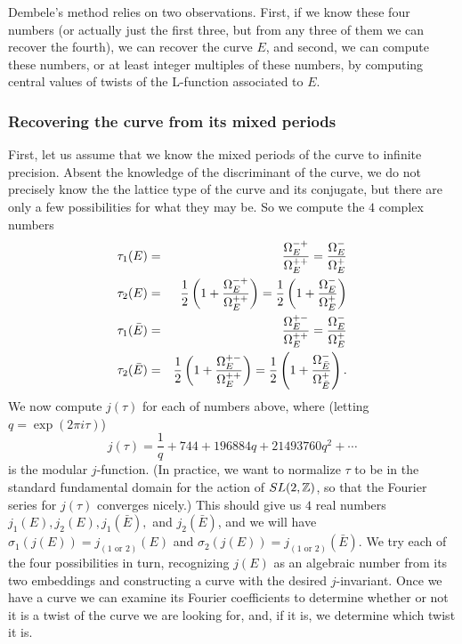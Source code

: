 Dembele's method relies on two observations. First, if we know these four numbers (or actually just the first three,
but from any three of them we can recover the fourth), we can recover the curve
$E$, and second, we can compute these numbers, or at least integer multiples of these numbers, by computing
central values of twists of the L-function associated to $E$.

\subsubsection{Recovering the curve from its mixed periods}

First, let us assume that we know the mixed periods of the curve to infinite precision. Absent the knowledge
of the discriminant of the curve, we do not precisely know the the lattice type of the curve and its conjugate,
but there are only a few possibilities for what they may be. So we compute the $4$ complex numbers
\begin{eqnarray*}
    \tau_1(E) &=& \frac{\Omega^{-+}_E}{\Omega^{++}_E} = \frac{\Omega^-_E}{\Omega^+_E} \\
    \tau_2(E) &=& \frac{1}{2}\left(1 + \frac{\Omega^{-+}_E}{\Omega^{++}_E}\right) = \frac{1}{2}\left(1 + \frac{\Omega^-_E}{\Omega^+_E}\right) \\
    \tau_1(\bar E) &=& \frac{\Omega^{+-}_E}{\Omega^{++}_E} = \frac{\Omega^-_E}{\Omega^+_E} \\
    \tau_2(\bar E) &=& \frac{1}{2}\left(1 + \frac{\Omega^{+-}_E}{\Omega^{++}_E}\right) = \frac{1}{2}\left(1 + \frac{\Omega^-_{\bar E}}{\Omega^+_{\bar E}}\right).
\end{eqnarray*}
We now compute $j(\tau)$ for each of numbers above, where (letting $q = \exp(2 \pi i \tau)$)
\[
    j(\tau) = \frac{1}{q} + 744 + 196884q + 21493760q^{2} + \cdots
\]
is the modular $j$-function. (In practice, we want to normalize $\tau$ to be in the standard fundamental
domain for the action of $SL(2, \mathbb{Z})$, so that the Fourier series for $j(\tau)$ converges nicely.) This should
give us $4$ real numbers $j_1(E), j_2(E), j_1(\bar E),$ and $j_2(\bar E)$, and we will have
$\sigma_1(j(E)) = j_{(1 \textrm{ or } 2)}(E)$ and $\sigma_2(j(E)) = j_{(1 \textrm{ or } 2)}(\bar E)$. We try
each of the four possibilities in turn, recognizing $j(E)$ as an algebraic number from its two embeddings and
constructing a curve with the desired $j$-invariant. Once we have a curve we can examine its Fourier coefficients
to determine whether or not it is a twist of the curve we are looking for, and, if it is, we determine
which twist it is.

